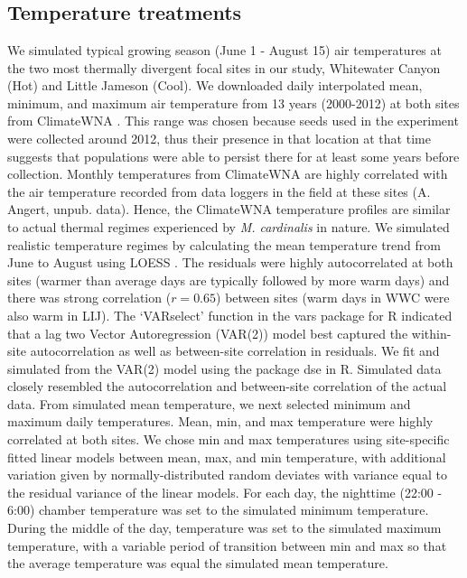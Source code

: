 \documentclass[11pt, oneside]{article}
\newcommand{\pkg}[1]{{\fontseries{b}\selectfont #1}}
\begin{document}
\section*{}

\subsection*{Temperature treatments}

We simulated typical growing season (June 1 - August 15) air temperatures at the two most thermally divergent focal sites in our study, Whitewater Canyon (Hot) and Little Jameson (Cool). We downloaded daily interpolated mean, minimum, and maximum air temperature from 13 years (2000-2012) at both sites from ClimateWNA \citep{Wang_etal_2012}. This range was chosen because seeds used in the experiment were collected around 2012, thus their presence in that location at that time suggests that populations were able to persist there for at least some years before collection. Monthly temperatures from ClimateWNA are highly correlated with the air temperature recorded from data loggers in the field at these sites (A. Angert, unpub. data). Hence, the ClimateWNA temperature profiles are similar to actual thermal regimes experienced by \textit{M. cardinalis} in nature. We simulated realistic temperature regimes by calculating the mean temperature trend from June to August using LOESS \citep{Cleveland_etal_1992}. The residuals were highly autocorrelated at both sites (warmer than average days are typically followed by more warm days) and there was strong correlation ($r = 0.65$) between sites (warm days in WWC were also warm in LIJ). The `VARselect' function in the \pkg{vars} package for R \citep{Pfaff_2008} indicated that a lag two Vector Autoregression (VAR(2)) model best captured the within-site autocorrelation as well as between-site correlation in residuals. We fit and simulated from the VAR(2) model using the package \pkg{dse} \citep{Gilbert_2014} in R. Simulated data closely resembled the autocorrelation and between-site correlation of the actual data. From simulated mean temperature, we next selected minimum and maximum daily temperatures. Mean, min, and max temperature were highly correlated at both sites. We chose min and max temperatures using site-specific fitted linear models between mean, max, and min temperature, with additional variation given by normally-distributed random deviates with variance equal to the residual variance of the linear models. For each day, the nighttime (22:00 - 6:00) chamber temperature was set to the simulated minimum temperature. During the middle of the day, temperature was set to the simulated maximum temperature, with a variable period of transition between min and max so that the average temperature was equal the simulated mean temperature.
\end{document}
